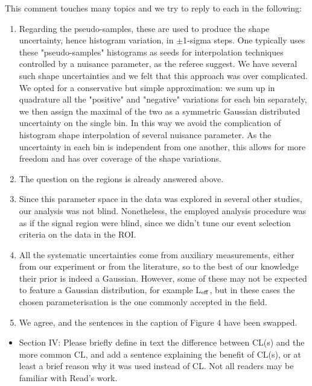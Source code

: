 \documentclass{article}
\begin{document}
This comment touches many topics and we try to reply to each in the following:
\begin{enumerate}
	\item Regarding the pseudo-samples, these are used to produce the shape uncertainty, hence histogram variation, in $\pm$1-sigma steps. One typically uses these "pseudo-samples" histograms  as seeds for interpolation techniques controlled by a nuisance parameter, as the referee suggest. We have several such shape uncertainties and we felt that this approach was over complicated. We opted for a conservative but simple approximation: we sum up in quadrature all the "positive" and "negative" variations for each bin separately, we then assign the maximal of the two as a symmetric Gaussian distributed uncertainty on the single bin.  In this way we avoid the complication of histogram shape interpolation of several nuisance parameter. As the uncertainty in each bin is independent from one another, this allows for more freedom and has over coverage of the shape variations.
	
	\item The question on the regions is already answered above. 
	
	\item Since this parameter space in the data was explored in several other studies, our analysis was not blind.
		Nonetheless, the employed analysis procedure was as if the signal region were blind, since we didn't tune our event selection criteria on the data in the ROI.

	\item All the systematic uncertainties come from auxiliary measurements, either from our experiment or from the literature, so 
		to the best of our knowledge their prior is indeed a Gaussian. 
		However, some of these may not be expected to feature a Gaussian distribution, for example L$_{\rm{eff}}$, but in these cases the chosen parameterisation
		is the one commonly accepted in the field.

	\item We agree, and the sentences in the caption of Figure 4 have been swapped.
\end{enumerate}





\begin{itemize}
	\item {\color{blue} Section IV: Please briefly define in text the difference between CL(s)
and the more common CL, and add a sentence explaining the benefit of
CL(s), or at least a brief reason why it was used instead of CL. Not
all readers may be familiar with Read’s work.}
\end{itemize}
\end{document}
